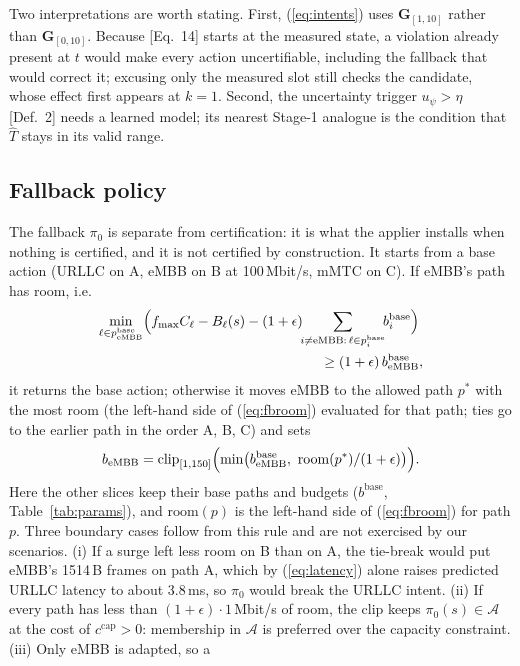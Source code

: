 \documentclass[conference]{IEEEtran}
\newcommand{\That}{\hat{T}}
\newcommand{\Acal}{\mathcal{A}}
\newcommand{\stlG}{\mathbf{G}}
\begin{document}
Two interpretations are worth stating. First, (\ref{eq:intents}) uses
$\stlG_{[1,10]}$ rather than $\stlG_{[0,10]}$. Because [Eq.~14] starts at the
measured state, a violation already present at $t$ would make every action
uncertifiable, including the fallback that would correct it; excusing only the
measured slot still checks the candidate, whose effect first appears at $k=1$.
Second, the uncertainty trigger $u_\psi > \eta$ [Def.~2] needs a learned model; its
nearest Stage-1 analogue is the condition that $\That$ stays in its valid range.

\subsection{Fallback policy}
The fallback $\pi_0$ is separate from certification: it is what the applier installs
when nothing is certified, and it is not certified by construction. It starts from a
base action (URLLC on A, eMBB on B at 100\,Mbit/s, mMTC on C). If eMBB's path has
room, i.e.\
\begin{equation}
\begin{aligned}
\min_{\ell\in p^{\mathrm{base}}_{\mathrm{eMBB}}}\Bigl(f_{\max}C_\ell - B_\ell(s)
 - (1+\epsilon)\!\!\sum_{i\neq \mathrm{eMBB}:\,\ell\in p^{\mathrm{base}}_i}\!\! b^{\mathrm{base}}_i\Bigr)&\\
\ge (1+\epsilon)\, b^{\mathrm{base}}_{\mathrm{eMBB}}&,
\end{aligned}
\label{eq:fbroom}
\end{equation}
it returns the base action; otherwise it moves eMBB to the allowed path $p^\ast$ with
the most room (the left-hand side of (\ref{eq:fbroom}) evaluated for that path; ties go
to the earlier path in the order A, B, C) and sets
\[
b_{\mathrm{eMBB}} = \mathrm{clip}_{[1,150]}\Bigl(\min\bigl(b^{\mathrm{base}}_{\mathrm{eMBB}},\ \mathrm{room}(p^\ast)/(1+\epsilon)\bigr)\Bigr).
\]
Here the other slices keep their base paths and budgets ($b^{\mathrm{base}}$,
Table~\ref{tab:params}), and $\mathrm{room}(p)$ is the left-hand side of
(\ref{eq:fbroom}) for path $p$. Three boundary cases follow from this rule and are
not exercised by our scenarios. (i) If a surge left less room on B than on A, the
tie-break would put eMBB's 1514\,B frames on path A, which by (\ref{eq:latency})
alone raises predicted URLLC latency to about 3.8\,ms, so $\pi_0$ would break the URLLC
intent. (ii) If every path has less than $(1+\epsilon)\cdot1$\,Mbit/s of room, the
clip keeps $\pi_0(s)\in\Acal$ at the cost of $c^{\mathrm{cap}} > 0$: membership in
$\Acal$ is preferred over the capacity constraint. (iii) Only eMBB is adapted, so a
\end{document}
